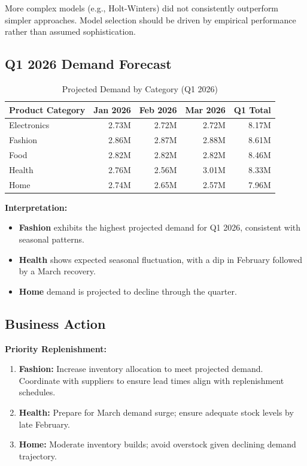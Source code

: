 \documentclass[11pt,a4paper]{article}
\begin{document}
\begin{keyfinding}
More complex models (e.g., Holt-Winters) did not consistently outperform simpler approaches. Model selection should be driven by empirical performance rather than assumed sophistication.
\end{keyfinding}

\subsection{Q1 2026 Demand Forecast}

\begin{table}[H]
\centering
\caption{Projected Demand by Category (Q1 2026)}
\label{tab:forecast}
\begin{tabular}{@{}lrrrr@{}}
\toprule
\textbf{Product Category} & \textbf{Jan 2026} & \textbf{Feb 2026} & \textbf{Mar 2026} & \textbf{Q1 Total} \\
\midrule
Electronics & 2.73M & 2.72M & 2.72M & 8.17M \\
Fashion & 2.86M & 2.87M & 2.88M & 8.61M \\
Food & 2.82M & 2.82M & 2.82M & 8.46M \\
Health & 2.76M & 2.56M & 3.01M & 8.33M \\
Home & 2.74M & 2.65M & 2.57M & 7.96M \\
\bottomrule
\end{tabular}
\end{table}

\textbf{Interpretation:}
\begin{itemize}[leftmargin=1.5em]
    \item \textbf{Fashion} exhibits the highest projected demand for Q1 2026, consistent with seasonal patterns.
    \item \textbf{Health} shows expected seasonal fluctuation, with a dip in February followed by a March recovery.
    \item \textbf{Home} demand is projected to decline through the quarter.
\end{itemize}

\subsection{Business Action}

\textbf{Priority Replenishment:}
\begin{enumerate}[leftmargin=1.5em]
    \item \textbf{Fashion:} Increase inventory allocation to meet projected demand. Coordinate with suppliers to ensure lead times align with replenishment schedules.
    \item \textbf{Health:} Prepare for March demand surge; ensure adequate stock levels by late February.
    \item \textbf{Home:} Moderate inventory builds; avoid overstock given declining demand trajectory.
\end{enumerate}
\end{document}
